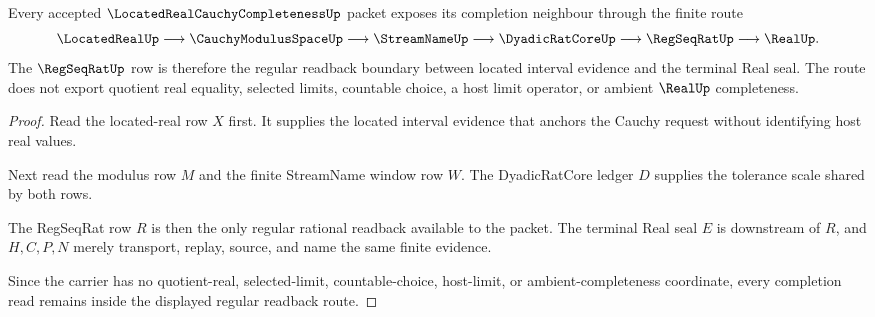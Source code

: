 \begin{theorem}
\label{thm:located-real-cauchy-completeness-regular-readback-route}
Every accepted $\LocatedRealCauchyCompletenessUp$ packet exposes its completion neighbour through the finite route
$$
\LocatedRealUp \longrightarrow \CauchyModulusSpaceUp \longrightarrow \StreamNameUp \longrightarrow \DyadicRatCoreUp \longrightarrow \RegSeqRatUp \longrightarrow \RealUp .
$$
The $\RegSeqRatUp$ row is therefore the regular readback boundary between located interval evidence and the terminal Real seal. The route does not export quotient real equality, selected limits, countable choice, a host limit operator, or ambient $\RealUp$ completeness.
\end{theorem}
\begin{proof}
Read the located-real row $X$ first. It supplies the located interval evidence that anchors the Cauchy request without identifying host real values.

Next read the modulus row $M$ and the finite StreamName window row $W$. The DyadicRatCore ledger $D$ supplies the tolerance scale shared by both rows.

The RegSeqRat row $R$ is then the only regular rational readback available to the packet. The terminal Real seal $E$ is downstream of $R$, and $H,C,P,N$ merely transport, replay, source, and name the same finite evidence.

Since the carrier has no quotient-real, selected-limit, countable-choice, host-limit, or ambient-completeness coordinate, every completion read remains inside the displayed regular readback route.
\end{proof}


\begin{closurestatus}{\LocatedRealCauchyCompletenessUp}
  \theoryclosure{\seedClosure}
  \formalstatus{\unformalizedV}
\end{closurestatus}

